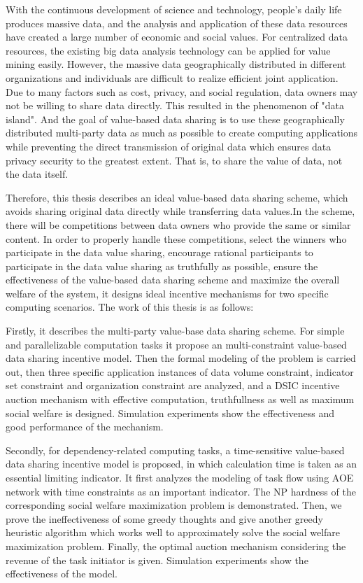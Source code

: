 \documentclass[promaster]{thesis-uestc}
\begin{document}
\begin{englishabstract}
With the continuous development of science and technology, people's daily life produces massive data, and the analysis and application of these data resources have created a large number of economic and social values. For centralized data resources, the existing big data analysis technology can be applied for value mining easily. However, the massive data geographically distributed in different organizations and individuals are difficult to realize efficient joint application.  Due to many factors such as cost, privacy, and social regulation, data owners may not be willing to share data directly.  This resulted in the phenomenon of "data island". And the goal of value-based data sharing is to use these geographically distributed multi-party data as much as possible to create computing applications while preventing the direct transmission of original data which ensures data privacy security to the greatest extent. That is, to share the value of data, not the data itself.

Therefore, this thesis describes an ideal value-based data sharing scheme, which avoids sharing original data directly while transferring data values.In the scheme, there will be competitions between data owners who provide the same or similar content. In order to properly handle these competitions, select the winners who participate in the data value sharing, encourage rational participants to participate in the data value sharing as truthfully as possible, ensure the effectiveness of the value-based data sharing scheme and maximize the overall welfare of the system, it designs ideal incentive mechanisms for two specific computing scenarios. The work of this thesis is as follows:

Firstly, it describes the multi-party value-base data sharing scheme.  For simple and parallelizable computation tasks it propose an multi-constraint value-based data sharing incentive model. Then the formal modeling of the problem is carried out, then three specific application instances of data volume constraint, indicator set constraint and organization constraint are analyzed, and a DSIC incentive auction mechanism with effective computation, truthfullness as well as maximum social welfare is designed.  Simulation experiments show the effectiveness and good performance of the mechanism.

Secondly, for dependency-related computing tasks, a time-sensitive value-based data sharing incentive model is proposed, in which calculation time is taken as an essential limiting indicator. It first analyzes the modeling of task flow using AOE network with time constraints as an important indicator.  The NP hardness of the corresponding social welfare maximization problem is demonstrated.  Then, we prove the ineffectiveness of some greedy thoughts and give another greedy heuristic algorithm which works well to approximately solve the social welfare maximization problem.  Finally, the optimal auction mechanism considering the revenue of the task initiator is given.  Simulation experiments show the effectiveness of the model.


\end{englishabstract}
\end{document}
